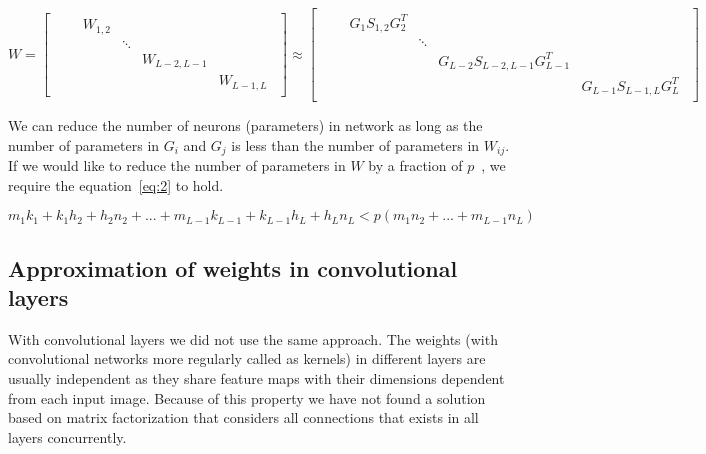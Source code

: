 \documentclass{article} %
\begin{document}
\begin{equation} \label{eq:1}
W = 
\begin{bmatrix} 
\begin{smallmatrix}
& &W_{1,2} & & & \\
& & &\ddots & & \\ 
& & & &W_{L-2,L-1} & \\ 
& & & & &W_{L-1,L} 
\end{smallmatrix}
\end{bmatrix} 
\approx 
\begin{bmatrix} 
\begin{smallmatrix}
& &G_1S_{1,2}G_2^T & & & \\ 
& & &\ddots & & \\ 
& & & &G_{L-2}S_{L-2,L-1}G_{L-1}^T & \\ 
& & & & &G_{L-1}S_{L-1,L}G_L^T 
\end{smallmatrix}
\end{bmatrix}
\end{equation}


We can reduce
the number of neurons (parameters) in network as long as the number of 
parameters
in $G_i$ and $G_j$ is less than the number of parameters in $W_{ij}$. If we 
would
like to reduce the number of parameters in $W$ by a fraction of
$p$~\cite{sainath2013low}, we require the equation~\ref{eq:2} to hold.

\begin{equation} \label{eq:2}
 m_1k_1 + k_1h_2 + h_2n_2 + ... + m_{L-1}k_{L-1} + k_{L-1}h_L + h_Ln_L < 
p(m_1n_2 + ... + m_{L-1}n_L)
\end{equation}

\subsection{Approximation of weights in convolutional layers}

With convolutional layers we did not use the same approach. The weights (with 
convolutional networks more regularly called as kernels) in different layers are 
usually independent as they share feature maps with their dimensions dependent 
from each input image. Because of this property we have not found a solution 
based on matrix factorization that considers all connections that exists in all 
layers concurrently. 
\end{document}

